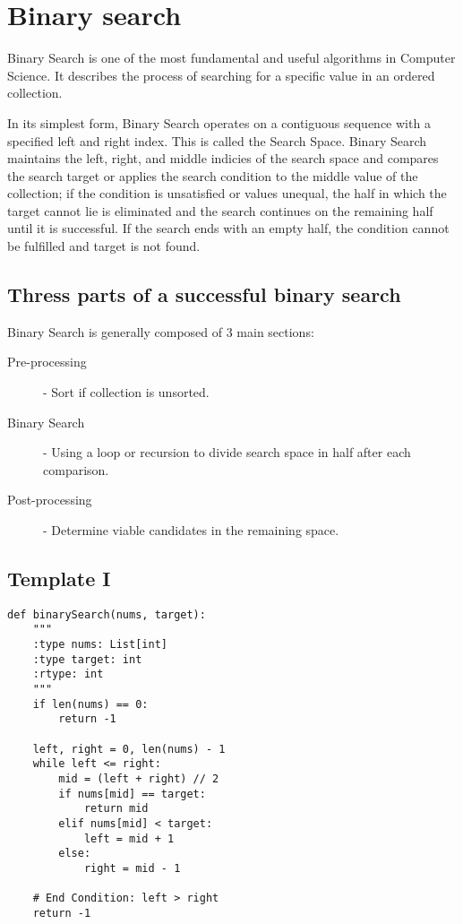 
\chapter{Binary search}

Binary Search is one of the most fundamental and useful algorithms in Computer Science.
It describes the process of searching for a specific value in an ordered collection.


In its simplest form, Binary Search operates on a contiguous sequence with a specified left and right index.
This is called the Search Space.
Binary Search maintains the left, right, and middle indicies of the search space and compares the search target or applies the search condition to the middle value of the collection; if the condition is unsatisfied or values unequal, the half in which the target cannot lie is eliminated and the search continues on the remaining half until it is successful.
If the search ends with an empty half, the condition cannot be fulfilled and target is not found.




\section{Thress parts of a successful binary search}


Binary Search is generally composed of 3 main sections:
\begin{description}
\item[Pre-processing] - Sort if collection is unsorted.
\item[Binary Search] - Using a loop or recursion to divide search space in half after each comparison.
\item[Post-processing]- Determine viable candidates in the remaining space.
\end{description}


\section{Template I}

\begin{lstlisting}
def binarySearch(nums, target):
    """
    :type nums: List[int]
    :type target: int
    :rtype: int
    """
    if len(nums) == 0:
        return -1

    left, right = 0, len(nums) - 1
    while left <= right:
        mid = (left + right) // 2
        if nums[mid] == target:
            return mid
        elif nums[mid] < target:
            left = mid + 1
        else:
            right = mid - 1

    # End Condition: left > right
    return -1  
\end{lstlisting}

